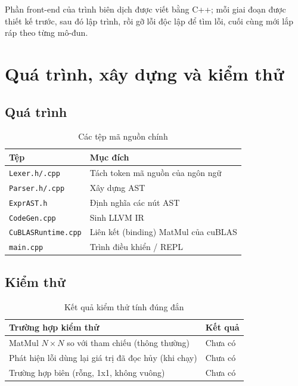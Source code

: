 \documentclass[a4paper]{article}
\begin{document}
	Phần front-end của trình biên dịch được viết bằng C++; mỗi giai đoạn được thiết kế trước, sau đó lập trình, rồi gỡ lỗi độc lập để tìm lỗi, cuối cùng mới lắp ráp theo từng mô-đun.
	\section{Quá trình, xây dựng và kiểm thử}
	\subsection{Quá trình}

		\begin{table}[h]
		\centering
		\caption{Các tệp mã nguồn chính}
		\label{tab:modules}
		\begin{tabular}{ll}
			\toprule
			Tệp & Mục đích \\
			\midrule
			\texttt{Lexer.h/.cpp} & Tách token mã nguồn của ngôn ngữ \\
			\texttt{Parser.h/.cpp} & Xây dựng AST \\
			\texttt{ExprAST.h} & Định nghĩa các nút AST \\
			\texttt{CodeGen.cpp} & Sinh LLVM IR \\
			\texttt{CuBLASRuntime.cpp} & Liên kết (binding) MatMul của cuBLAS \\
			\texttt{main.cpp} & Trình điều khiển / REPL \\
			\bottomrule
		\end{tabular}
	\end{table}
	
	
	
	
	\subsection{Kiểm thử}
	
	\begin{table}[h]
		\centering
		\caption{Kết quả kiểm thử tính đúng đắn}
		\label{tab:verification}
		\begin{tabular}{ll}
			\toprule
			Trường hợp kiểm thử & Kết quả \\
			\midrule
			MatMul $N \times N$ so với tham chiếu (thông thường) & Chưa có \\
			Phát hiện lỗi dùng lại giá trị đã đọc hủy (khi chạy) & Chưa có \\
			Trường hợp biên (rỗng, 1x1, không vuông) & Chưa có \\
			\bottomrule
		\end{tabular}
	\end{table}
\end{document}
